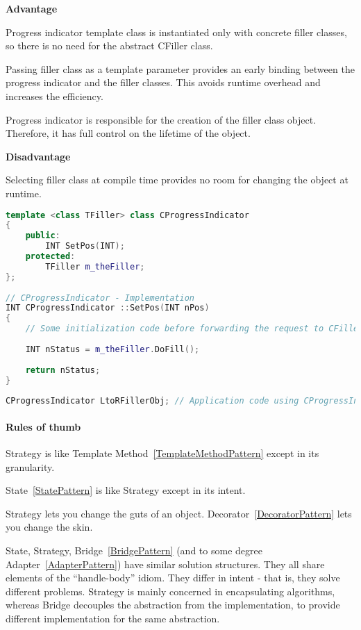 \documentclass{book}
\begin{document}
\textbf{Advantage}

    Progress indicator template class is instantiated only with concrete filler classes, so there is no need for the abstract CFiller class.

    Passing filler class as a template parameter provides an early binding between the progress indicator and the filler classes. This avoids runtime overhead and increases the efficiency.

    Progress indicator is responsible for the creation of the filler class object. Therefore, it has full control on the lifetime of the object.

\textbf{Disadvantage}

    Selecting filler class at compile time provides no room for changing the object at runtime. 
\begin{lstlisting}[caption={Strategy Pattern Sample 4: 3 - Strategy as a template class parameter}, language=C++]
template <class TFiller> class CProgressIndicator
{
	public:
		INT SetPos(INT);
	protected:
		TFiller m_theFiller;
};
 
// CProgressIndicator - Implementation
INT CProgressIndicator ::SetPos(INT nPos)
{
	// Some initialization code before forwarding the request to CFiller object
			
	INT nStatus = m_theFiller.DoFill();
			
	return nStatus;
}
 
CProgressIndicator LtoRFillerObj; // Application code using CProgressIndicator
\end{lstlisting}
\paragraph{Rules of thumb}

    Strategy is like Template Method~\ref{TemplateMethodPattern} except in its granularity.

    State~\ref{StatePattern} is like Strategy except in its intent.

    Strategy lets you change the guts of an object. Decorator~\ref{DecoratorPattern} lets you change the skin.

    State, Strategy, Bridge~\ref{BridgePattern} (and to some degree Adapter~\ref{AdapterPattern}) have similar solution structures.
    They all share elements of the ``handle-body'' idiom. They differ in intent - that is, they solve different problems.
    Strategy is mainly concerned in encapsulating algorithms, whereas Bridge decouples the abstraction from the implementation, to provide different implementation for the same abstraction. 
\end{document}
